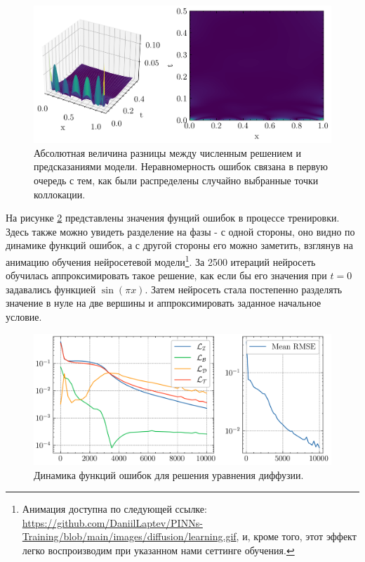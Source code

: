 \documentclass[a4paper, 12pt]{article}
\begin{document}
\begin{figure}[h]
    \centering
    \includegraphics{../Differential Equation Solution/images/diffusion/Error.png}
    \caption{Абсолютная величина разницы между численным решением и предсказаниями модели. Неравномерность ошибок связана в первую очередь с тем, как были распределены случайно выбранные точки коллокации.}
    \label{fig:diffusion:error}
\end{figure}

На рисунке \ref{fig:diffusion:losses} представлены значения фунций ошибок в процессе тренировки. Здесь также можно увидеть разделение на фазы - с одной стороны, оно видно по динамике функций ошибок, а с другой стороны его можно заметить, взглянув на анимацию обучения нейросетевой модели\footnote{Анимация доступна по следующей ссылке: \url{https://github.com/DaniilLaptev/PINNs-Training/blob/main/images/diffusion/learning.gif}, и, кроме того, этот эффект легко воспроизводим при указанном нами сеттинге обучения.}. За 2500 итераций нейросеть обучилась аппроксимировать такое решение, как если бы его значения при $t=0$ задавались функцией $\sin(\pi x)$. Затем нейросеть стала постепенно разделять значение в нуле на две вершины и аппроксимировать заданное начальное условие.

\begin{figure}
    \centering
    \includegraphics{../Differential Equation Solution/images/diffusion/Loss report.png}
    \caption{Динамика функций ошибок для решения уравнения диффузии.}
    \label{fig:diffusion:losses}
\end{figure}
\end{document}
